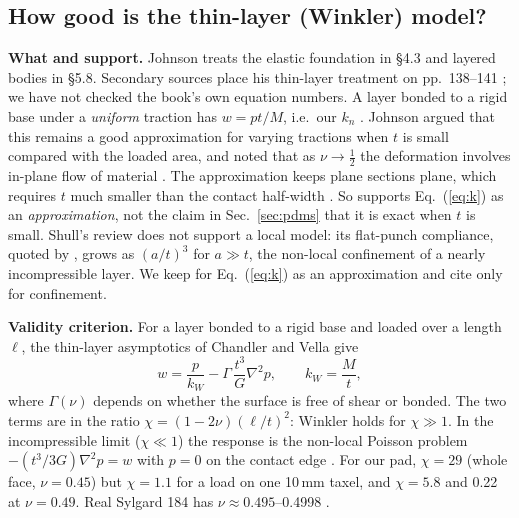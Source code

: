 \documentclass[10pt,twocolumn]{article}
\begin{document}
\subsection{How good is the thin-layer (Winkler) model?}\label{sec:winkler}
\textbf{What \cite{johnson1985} and \cite{shull2002} support.} Johnson \cite{johnson1985} treats the elastic foundation in \S4.3 and layered
bodies in \S5.8. Secondary sources place his thin-layer treatment on pp.~138--141 \cite{ciavarella_papangelo2018};
we have not checked the book's own equation numbers. A layer bonded to a rigid base under a \emph{uniform}
traction has $w=pt/M$, i.e.\ our $k_n$ \cite{ciavarella2019}. Johnson argued that this remains a good
approximation for varying tractions when $t$ is small compared with the loaded area, and noted that as
$\nu\to\frac12$ the deformation involves in-plane flow of material \cite{ciavarella2019}. The approximation keeps
plane sections plane, which requires $t$ much smaller than the contact half-width \cite{ciavarella_papangelo2018}.
So \cite{johnson1985} supports Eq.~(\ref{eq:k}) as an \emph{approximation}, not the claim in Sec.~\ref{sec:pdms} that it is exact
when $t$ is small. Shull's review \cite{shull2002} does not support a local model: its flat-punch compliance,
quoted by \cite{wang2015}, grows as $(a/t)^3$ for $a\gg t$, the non-local confinement of a nearly incompressible
layer. We keep \cite{johnson1985} for Eq.~(\ref{eq:k}) as an approximation and cite \cite{shull2002} only for confinement.

\textbf{Validity criterion.} For a layer bonded to a rigid base and loaded over a length $\ell$, the thin-layer
asymptotics of Chandler and Vella \cite{chandler_vella2020} give
\begin{equation}
w=\frac{p}{k_W}-\Gamma\,\frac{t^3}{G}\nabla^2p,\qquad k_W=\frac{M}{t},
\label{eq:cv}
\end{equation}
where $\Gamma(\nu)$ depends on whether the surface is free of shear or bonded. The two terms are in the ratio
$\chi=(1-2\nu)(\ell/t)^2$: Winkler holds for $\chi\gg1$. In the incompressible limit ($\chi\ll1$) the response is
the non-local Poisson problem $-(t^3/3G)\nabla^2p=w$ with $p=0$ on the contact edge
\cite{argatov_mishuris_popov2016,argatov_mishuris_popov2024}. For our pad, $\chi=29$ (whole face, $\nu=0.45$) but
$\chi=1.1$ for a load on one 10\,mm taxel, and $\chi=5.8$ and 0.22 at $\nu=0.49$. Real Sylgard 184 has
$\nu\approx0.495$--0.4998 \cite{mueller2019,sandia_bulk,johnston2014}.
\end{document}

